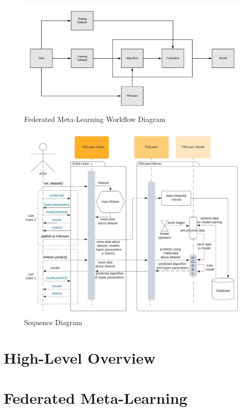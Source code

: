 \begin{figure}[H]
    \centering
    \includegraphics[width=15cm]{images/FML Workflow.jpeg}
    \caption{Federated Meta-Learning Workflow Diagram}
    \label{fml-workflow-diagram}
\end{figure}

\begin{figure}[H]
    \centering
    \includegraphics[width=15cm]{images/Sequence Diagram.jpeg}
    \caption{Sequence Diagram}
    \label{sequence-diagram}
\end{figure}

\section{High-Level Overview}

\section{Federated Meta-Learning}
\label{federated-meta-learning}

